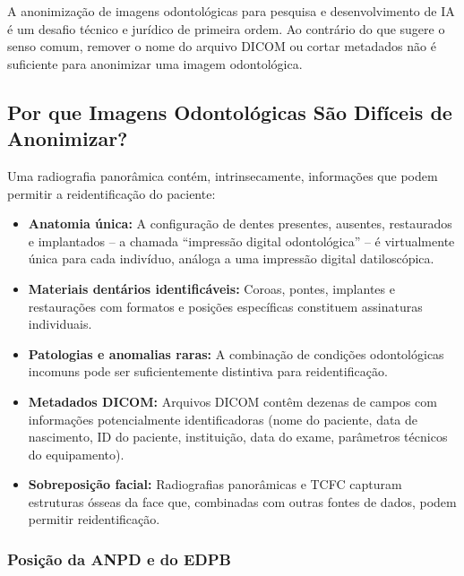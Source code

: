 \nivelcinco

A anonimização de imagens odontológicas para pesquisa e desenvolvimento de IA
é um desafio técnico e jurídico de primeira ordem. Ao contrário do que sugere o
senso comum, remover o nome do arquivo DICOM ou cortar metadados não é
suficiente para anonimizar uma imagem odontológica.

 

\subsection{Por que Imagens Odontológicas São Difíceis de Anonimizar?}

Uma radiografia panorâmica contém, intrinsecamente, informações que podem
permitir a reidentificação do paciente:

\begin{itemize}
  \item \textbf{Anatomia única:} A configuração de dentes presentes, ausentes,
    restaurados e implantados -- a chamada ``impressão digital odontológica'' --
    é virtualmente única para cada indivíduo, análoga a uma impressão digital
    datiloscópica.
  \item \textbf{Materiais dentários identificáveis:} Coroas, pontes, implantes
    e restaurações com formatos e posições específicas constituem assinaturas
    individuais.
  \item \textbf{Patologias e anomalias raras:} A combinação de condições
    odontológicas incomuns pode ser suficientemente distintiva para
    reidentificação.
  \item \textbf{Metadados DICOM:} Arquivos DICOM contêm dezenas de campos com
    informações potencialmente identificadoras (nome do paciente, data de
    nascimento, ID do paciente, instituição, data do exame, parâmetros técnicos
    do equipamento).
  \item \textbf{Sobreposição facial:} Radiografias panorâmicas e TCFC capturam
    estruturas ósseas da face que, combinadas com outras fontes de dados,
    podem permitir reidentificação.
\end{itemize}

\subsubsection{Posição da ANPD e do EDPB}


